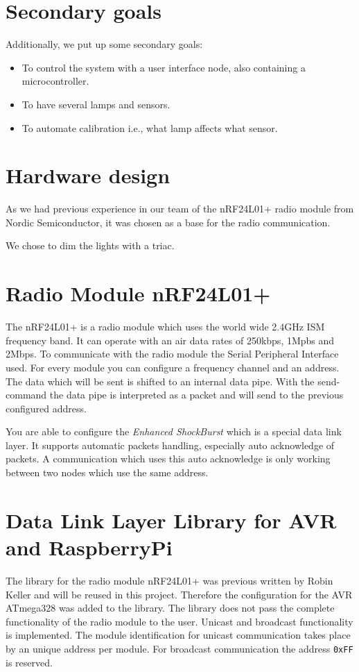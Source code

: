 \documentclass[11pt]{article}
\begin{document}
	\section{Secondary goals}
   Additionally, we put up some secondary goals:
	\begin{itemize}
		\item To control the system with a user interface node, also containing a microcontroller.
		\item To have several lamps and sensors.
		\item To automate calibration i.e., what lamp affects what sensor.
	\end{itemize}

   \section{Hardware design}
   As we had previous experience in our team of the nRF24L01+ radio module from
   Nordic Semiconductor, it was chosen as a base for the radio communication.

   We chose to dim the lights with a triac.
   
   \section{Radio Module nRF24L01+}
   The nRF24L01+ is a radio module which uses the world wide 2.4GHz ISM frequency band. It can operate with an air data rates of 250kbps, 1Mpbs and 2Mbps. To communicate with the radio module the Serial Peripheral Interface used. For every module you can configure a frequency channel and an address. The data which will be sent is shifted to an internal data pipe. With the send-command the data pipe is interpreted as a packet and will send to the previous configured address.
   
   You are able to configure the \textit{Enhanced ShockBurst\texttrademark} which is a special data link layer. It supports automatic packets handling, especially auto acknowledge of packets.
   A communication which uses this auto acknowledge is only working between two nodes which use the same address.
   
   \section{Data Link Layer Library for AVR and RaspberryPi}
   The library for the radio module nRF24L01+ was previous written by Robin Keller and will be reused in this project. Therefore the configuration for the AVR ATmega328 was added to the library.
   The library does not pass the complete functionality of the radio module to the user. Unicast and broadcast functionality is implemented. The module identification for unicast communication takes place by an unique address per module. For broadcast communication the address \texttt{0xFF} is reserved.
   
\end{document}
